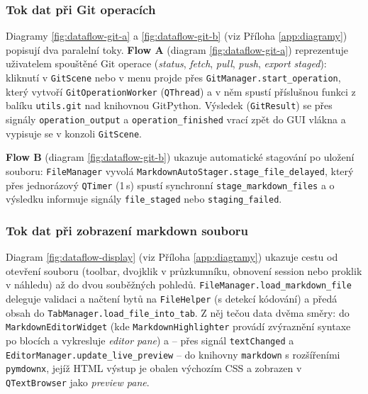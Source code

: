 \documentclass[12pt, a4paper]{article}
\begin{document}
\subsubsection*{Tok dat při Git operacích}

Diagramy \ref{fig:dataflow-git-a} a \ref{fig:dataflow-git-b} (viz Příloha \ref{app:diagramy}) popisují dva paralelní toky. 
\textbf{Flow A} (diagram \ref{fig:dataflow-git-a}) reprezentuje uživatelem spouštěné Git operace (\emph{status}, 
\emph{fetch}, \emph{pull}, \emph{push}, \emph{export staged}): kliknutí v \texttt{GitScene} nebo v menu projde 
přes \texttt{GitManager.\allowbreak start\_operation}, který vytvoří \texttt{GitOperationWorker} (\texttt{QThread}) 
a v něm spustí příslušnou funkci z balíku \texttt{utils.git} nad knihovnou GitPython. Výsledek (\texttt{GitResult}) 
se přes signály \texttt{operation\_output} a \texttt{operation\_finished} vrací zpět do GUI vlákna a vypisuje se
v konzoli \texttt{GitScene}. 

\textbf{Flow B} (diagram \ref{fig:dataflow-git-b}) ukazuje automatické stagování po uložení souboru: 
\texttt{FileManager} vyvolá \texttt{MarkdownAutoStager.\allowbreak stage\_file\_delayed}, který přes 
jednorázový \texttt{QTimer} (1\,s) spustí synchronní \texttt{stage\_\allowbreak markdown\_\allowbreak files} 
a o výsledku informuje signály \texttt{file\_\allowbreak staged} nebo \texttt{staging\_\allowbreak failed}.

\subsubsection*{Tok dat při zobrazení markdown souboru}

Diagram \ref{fig:dataflow-display} (viz Příloha \ref{app:diagramy}) ukazuje cestu od otevření souboru 
(toolbar, dvojklik v průzkumníku, obnovení session nebo proklik v náhledu) až do dvou souběžných pohledů. 
\texttt{FileManager.\allowbreak load\_markdown\_file} deleguje validaci a načtení bytů na \texttt{FileHelper} 
(s detekcí kódování) a předá obsah do \texttt{TabManager.\allowbreak load\_file\_into\_tab}. 
Z něj tečou data dvěma směry: do \texttt{MarkdownEditorWidget} (kde \texttt{MarkdownHighlighter} 
provádí zvýraznění syntaxe po blocích a vykresluje \emph{editor pane}) a -- přes signál \texttt{textChanged} 
a \texttt{EditorManager.\allowbreak update\_live\_preview} -- do knihovny \texttt{markdown} s rozšířeními \texttt{pymdownx}, 
jejíž HTML výstup je obalen výchozím CSS a zobrazen v \texttt{QTextBrowser} jako \emph{preview pane}.
\end{document}
